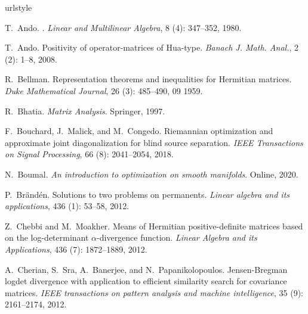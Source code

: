 \documentclass[11pt]{article}
\begin{document}
\setlength{\bibsep}{2pt}

%
\begin{thebibliography}{33}
\providecommand{\natexlab}[1]{#1}
\providecommand{\url}[1]{\texttt{#1}}
\expandafter\ifx\csname urlstyle\endcsname\relax
  \providecommand{\doi}[1]{doi: #1}\else
  \providecommand{\doi}{doi: \begingroup \urlstyle{rm}\Url}\fi

T.~Ando.
.
\newblock \emph{Linear and Multilinear Algebra}, 8 (4):
  347--352, 1980.

T.~Ando.
\newblock Positivity of operator-matrices of {H}ua-type.
\newblock \emph{Banach J. Math. Anal.}, 2 (2): 1--8, 2008.

R.~Bellman.
\newblock Representation theorems and inequalities for {H}ermitian matrices.
\newblock \emph{Duke Mathematical Journal}, 26 (3): 485--490,
  09 1959.

R.~Bhatia.
\newblock \emph{{Matrix Analysis}}.
\newblock Springer, 1997.

F.~Bouchard, J.~Malick, and M.~Congedo.
\newblock Riemannian optimization and approximate joint diagonalization for
  blind source separation.
\newblock \emph{IEEE Transactions on Signal Processing}, 66
  (8): 2041--2054, 2018.

N.~Boumal.
\newblock \emph{An introduction to optimization on smooth manifolds}.
\newblock Online, 2020.

P.~Br{\"a}nd{\'e}n.
\newblock Solutions to two problems on permanents.
\newblock \emph{Linear algebra and its applications}, 436
  (1): 53--58, 2012.

Z.~Chebbi and M.~Moakher.
\newblock Means of {H}ermitian positive-definite matrices based on the
  log-determinant $\alpha$-divergence function.
\newblock \emph{Linear Algebra and its Applications}, 436
  (7): 1872--1889, 2012.

A.~Cherian, S.~Sra, A.~Banerjee, and N.~Papanikolopoulos.
\newblock Jensen-{B}regman logdet divergence with application to efficient
  similarity search for covariance matrices.
\newblock \emph{IEEE transactions on pattern analysis and machine
  intelligence}, 35 (9): 2161--2174, 2012.


\end{thebibliography}
\end{document}

